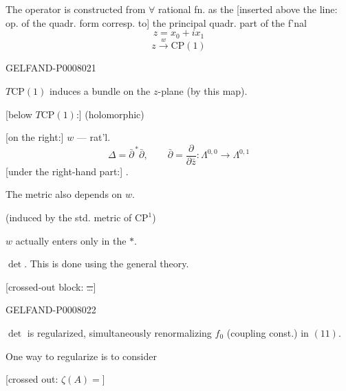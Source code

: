 The operator is constructed from \(\forall\) rational fn. as the
[inserted above the line: op. of the quadr. form corresp. to] the principal quadr. part of the f’nal
\[
z=x_0+ix_1
\]
\begin{equation*}
z\xrightarrow{w}\mathrm{CP}(1)
\tag{14}
\end{equation*}


\begin{GelfandAdjacentEvidence}{GELFAND-P000802}{1}

\(T\mathrm{CP}(1)\) induces a bundle on the \(z\)-plane (by this map).

[below \(T\mathrm{CP}(1)\):] (holomorphic)

[on the right:] \(w\) --- rat'l.
\begin{equation*}
\Delta=\bar\partial^{\,*}\bar\partial,\qquad
\bar\partial=\frac{\partial}{\partial\bar z}:\Lambda^{0,0}\to\Lambda^{0,1}
\tag{15}
\end{equation*}
[under the right-hand part:] .

The metric also depends on \(w\).

(induced by the std. metric of \(\mathrm{CP}^{1}\))

\(w\) actually enters only in the \(*\).

 \(\det\). This is done using the general theory.

[crossed-out block: \sout{\ldots}]
\end{GelfandAdjacentEvidence}
\begin{GelfandAdjacentEvidence}{GELFAND-P000802}{2}


\(\det\) is regularized, simultaneously renormalizing \(f_0\) (coupling const.) in \((11)\).

One way to regularize is to consider

[crossed out: \sout{\(\zeta(A)=\)}]
\end{GelfandAdjacentEvidence}
